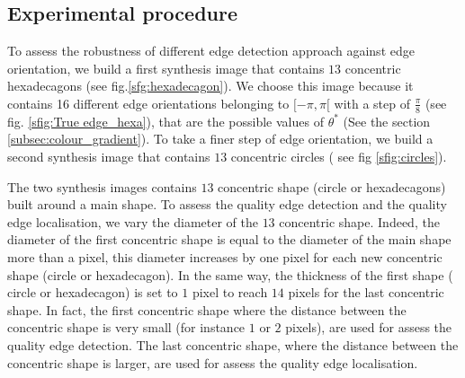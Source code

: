 \documentclass[twoside]{article}
\begin{document}
\subsection{Experimental procedure}
\label{subsec:Experimental procedure}
 To assess the robustness of different edge detection approach against edge orientation, we build a first synthesis image that contains $13$ concentric hexadecagons (see fig.\ref{sfg:hexadecagon}). We choose this image because it contains 16 different edge orientations belonging to $[-\pi,\pi[$ with a step of $\frac{\pi}{8}$ (see fig. \ref{sfig:True edge_hexa}), that are the possible values of $\theta^{*}$ (See the section \ref{subsec:colour_gradient}).
 To take a finer step of edge orientation, we build a second synthesis image that contains $13$ concentric circles ( see fig \ref{sfig:circles}).
 
 The two synthesis images contains $13$ concentric shape (circle or hexadecagons) built around a main shape. To assess the quality edge detection and the quality edge localisation, we vary the diameter of the $13$ concentric shape. Indeed,  the diameter of the first concentric shape is equal to the diameter of the main shape more than a pixel, this diameter increases by one pixel for each new concentric shape (circle or hexadecagon). In the same way, the thickness of the first shape ( circle or hexadecagon) is set to $1$ pixel to  reach $14$ pixels for the last concentric shape. 
 In fact, the first concentric shape where the distance between the concentric shape is very small (for instance $1$ or $2$ pixels), are used for assess the quality edge detection. The last concentric shape, where the distance between the concentric shape is larger, are used for assess the quality edge localisation.       
 
\end{document}
